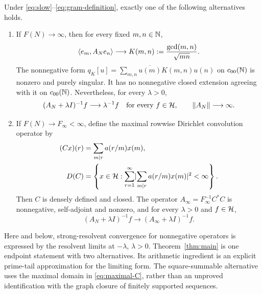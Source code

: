 \begin{theorem}
\label{thm:main}
Under \eqref{eq:slow}--\eqref{eq:gram-definition}, exactly one of the
following alternatives holds.
\begin{enumerate}
\item If $F(N)\to\infty$, then for every fixed $m,n\in\mathbb{N}$,
\begin{equation}
 \langle e_m,A_Ne_n\rangle\longrightarrow
 K(m,n):=\frac{\gcd(m,n)}{\sqrt{mn}}.
 \label{eq:critical-kernel}
\end{equation}
The nonnegative form
$q_K[u]=\sum_{m,n}\overline{u(m)}K(m,n)u(n)$ on $c_{00}(\mathbb{N})$ is nonzero
and purely singular. It has no nonnegative closed extension agreeing
with it on $c_{00}(\mathbb{N})$. Nevertheless, for every $\lambda>0$,
\begin{equation}
 (A_N+\lambda I)^{-1}f\longrightarrow\lambda^{-1}f
 \quad\text{for every } f\in\mathcal{H},
 \qquad \lVert A_N\rVert\longrightarrow\infty.
 \label{eq:divergent-limit}
\end{equation}
\item If $F(N)\to F_\infty<\infty$, define the maximal rowwise
Dirichlet convolution operator by
\begin{equation}
 \begin{split}
 (Cx)(r)&=\sum_{m\mid r}a(r/m)x(m),\\
 D(C)&=\left\{x\in\mathcal{H}:
  \sum_{r=1}^{\infty}
  \lvert \sum_{m\mid r}a(r/m)x(m)\rvert^2<\infty\right\}.
 \end{split}
 \label{eq:maximal-C}
\end{equation}
Then $C$ is densely defined and closed. The operator
$A_\infty=F_\infty^{-1}C^*C$ is nonnegative, self-adjoint and nonzero,
and for every $\lambda>0$ and $f\in\mathcal{H}$,
\begin{equation}
 (A_N+\lambda I)^{-1}f
 \longrightarrow(A_\infty+\lambda I)^{-1}f.
 \label{eq:summable-limit}
\end{equation}
\end{enumerate}
\end{theorem}

Here and below, strong-resolvent convergence for nonnegative operators is
expressed by the resolvent limits at $-\lambda$, $\lambda>0$.
Theorem~\ref{thm:main} is one endpoint statement with two alternatives.
Its arithmetic ingredient is an explicit prime-tail approximation for
the limiting form. The square-summable alternative uses the maximal domain
in \eqref{eq:maximal-C}, rather than an unproved identification with the
graph closure of finitely supported sequences.

